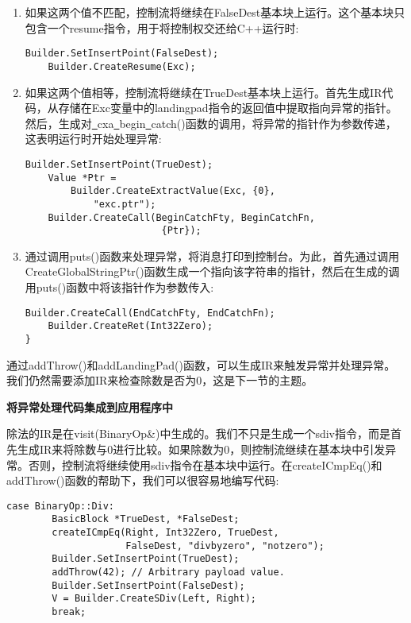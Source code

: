 \begin{enumerate}
\item 如果这两个值不匹配，控制流将继续在FalseDest基本块上运行。这个基本块只包含一个resume指令，用于将控制权交还给C++运行时:
\begin{lstlisting}[caption={}]
	Builder.SetInsertPoint(FalseDest);
	Builder.CreateResume(Exc);
\end{lstlisting}

\item 如果这两个值相等，控制流将继续在TrueDest基本块上运行。首先生成IR代码，从存储在Exc变量中的landingpad指令的返回值中提取指向异常的指针。然后，生成对\underline{~}cxa\underline{~}begin\underline{~}catch()函数的调用，将异常的指针作为参数传递，这表明运行时开始处理异常:
\begin{lstlisting}[caption={}]
	Builder.SetInsertPoint(TrueDest);
	Value *Ptr =
		Builder.CreateExtractValue(Exc, {0}, 
			"exc.ptr");
	Builder.CreateCall(BeginCatchFty, BeginCatchFn,
						{Ptr});
\end{lstlisting}

\item 通过调用puts()函数来处理异常，将消息打印到控制台。为此，首先通过调用CreateGlobalString\allowbreak Ptr()函数生成一个指向该字符串的指针，然后在生成的调用puts()函数中将该指针作为参数传入:
\begin{lstlisting}[caption={}]
	Builder.CreateCall(EndCatchFty, EndCatchFn);
	Builder.CreateRet(Int32Zero);
}
\end{lstlisting}
\end{enumerate}

通过addThrow()和addLandingPad()函数，可以生成IR来触发异常并处理异常。我们仍然需要添加IR来检查除数是否为0，这是下一节的主题。\par

\hspace*{\fill} \par %
\textbf{将异常处理代码集成到应用程序中}

除法的IR是在visit(BinaryOp\&)中生成的。我们不只是生成一个sdiv指令，而是首先生成IR来将除数与0进行比较。如果除数为0，则控制流继续在基本块中引发异常。否则，控制流将继续使用sdiv指令在基本块中运行。在createICmpEq()和addThrow()函数的帮助下，我们可以很容易地编写代码:\par

\begin{lstlisting}[caption={}]
	case BinaryOp::Div:
		BasicBlock *TrueDest, *FalseDest;
		createICmpEq(Right, Int32Zero, TrueDest,
					 FalseDest, "divbyzero", "notzero");
		Builder.SetInsertPoint(TrueDest);
		addThrow(42); // Arbitrary payload value.
		Builder.SetInsertPoint(FalseDest);
		V = Builder.CreateSDiv(Left, Right);
		break;
\end{lstlisting}

